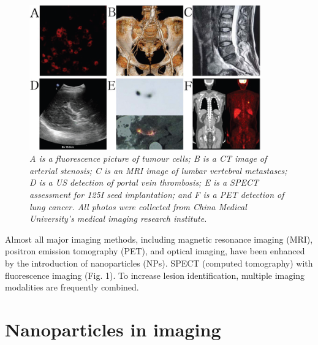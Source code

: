 \documentclass[12pt]{article}
\begin{document}
\begin{figure}[htp]
    \centering
    \includegraphics[width=10cm]{6.png}
    \caption{\textit{A is a fluorescence picture of tumour cells; B is a CT image of arterial stenosis; C is an MRI image of lumbar vertebral metastases; D is a US detection of portal vein thrombosis; E is a SPECT assessment for 125I seed implantation; and F is a PET detection of lung cancer. All photos were collected from China Medical University's medical imaging research institute.}}
    \label{fig:1}
\end{figure}
Almost all major imaging methods, including magnetic resonance imaging (MRI), positron emission tomography (PET), and optical imaging, have been enhanced by the introduction of nanoparticles (NPs). SPECT (computed tomography) with fluorescence imaging (Fig. 1). To increase lesion identification, multiple imaging modalities are frequently combined. 

\section*{Nanoparticles in imaging }
\end{document}
